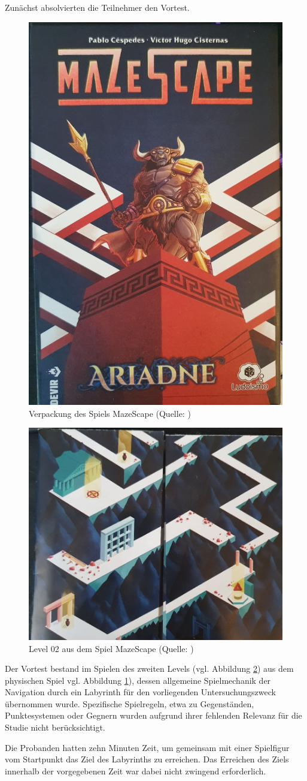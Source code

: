 Zunächst absolvierten die Teilnehmer den Vortest.

\begin{figure}[ht]
\centering
\includegraphics[width=0.3\linewidth]{content/pictures/MazeScape.jpg}
\caption{Verpackung des Spiels MazeScape (Quelle: \citealp{cespedes_mazescape_2023})}
\label{fig:mazescape}
\end{figure}

\begin{figure}[ht]
\centering
\includegraphics[width=0.5\linewidth]{content/pictures/MazeScape_Level02.jpg}
\caption{Level 02 aus dem Spiel MazeScape (Quelle: \citealp{cespedes_mazescape_2023})}
\label{fig:mazescape_level-02}
\end{figure}

Der Vortest bestand im Spielen des zweiten Levels (vgl. Abbildung \ref{fig:mazescape_level-02}) aus dem physischen Spiel  vgl. Abbildung \ref{fig:mazescape}), dessen allgemeine Spielmechanik der Navigation durch ein Labyrinth für den vorliegenden Untersuchungszweck übernommen wurde. Spezifische Spielregeln, etwa zu Gegenständen, Punktesystemen oder Gegnern wurden aufgrund ihrer fehlenden Relevanz für die Studie nicht berücksichtigt.

Die Probanden hatten zehn Minuten Zeit, um gemeinsam mit einer Spielfigur vom Startpunkt das Ziel des Labyrinths zu erreichen. Das Erreichen des Ziels innerhalb der vorgegebenen Zeit war dabei nicht zwingend erforderlich.

